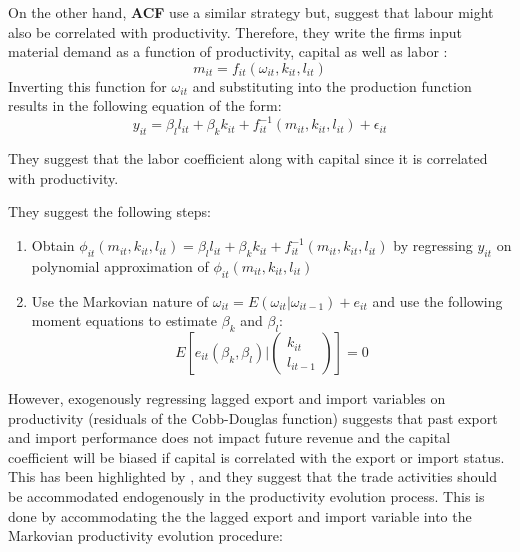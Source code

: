 \documentclass[12pt]{article}
\begin{document}
On the other hand, \textcite{ackerberg2006structural} \textbf{ACF} use a
similar strategy but, suggest that labour might also be
correlated with productivity. Therefore, they write  the firms input
material demand as a function of productivity, capital as well as
labor : 
$$ m_{it} = f_{it}(\omega_{it}, k_{it}, l_{it})$$
Inverting this function for $\omega_{it}$ and substituting into the
production function results in the following 
equation of the form:
\begin{equation}
y_{it} = \beta_{l}l_{it} + \beta_k k_{it} + f_{it}^{-1}(m_{it},
k_{it}, l_{it})+ \epsilon_{it}
\end{equation}


They suggest that the  labor coefficient along with capital since it is correlated with
productivity. 

They suggest the following steps:
\begin{enumerate}
\item Obtain $\phi_{it}(m_{it}, k_{it}, l_{it}) = \beta_{l}l_{it} + \beta_k k_{it} + f_{it}^{-1}(m_{it},
k_{it}, l_{it})$ by regressing $y_{it}$ on polynomial approximation of
$\phi_{it}(m_{it}, k_{it}, l_{it})$
\item Use the Markovian nature of $\omega_{it} =
  E(\omega_{it}|\omega_{it-1}) + e_{it}$
and use the following moment equations to estimate $\beta_{k}$ and
$\beta_{l}$:
\begin{equation}
E[e_{it}(\beta_{k},\beta_{l})|\begin{pmatrix}k_{it}\\ l_{it-1}
\end{pmatrix}
]= 0
\end{equation}
\end{enumerate} 


However, exogenously regressing lagged  export and import variables  on
productivity (residuals of the Cobb-Douglas function) suggests that past
export and import performance  does not impact future revenue and the
capital coefficient will be biased if capital is correlated with the
export or import status.  This has been highlighted by \textcite{de2013detecting}, and
they suggest that the trade activities should be accommodated
endogenously in the productivity evolution process. This is done by
accommodating the the lagged export and import variable into the
Markovian productivity evolution procedure:
\end{document}
